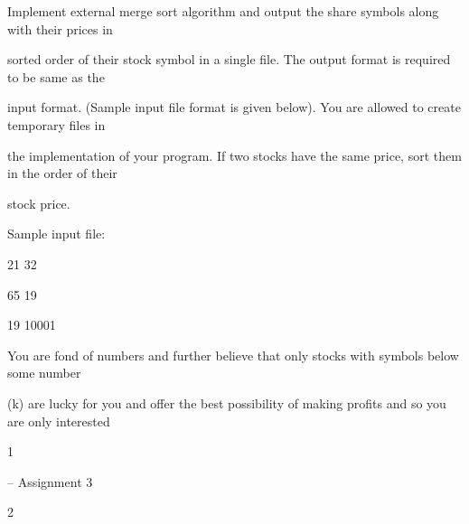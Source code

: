 \documentclass[a4paper,portrait,12pt]{article}
\begin{document}
\begin{flushleft}
Implement external merge sort algorithm and output the share symbols along with their prices in
\end{flushleft}


\begin{flushleft}
sorted order of their stock symbol in a single file. The output format is required to be same as the
\end{flushleft}


\begin{flushleft}
input format. (Sample input file format is given below). You are allowed to create temporary files in
\end{flushleft}


\begin{flushleft}
the implementation of your program. If two stocks have the same price, sort them in the order of their
\end{flushleft}


\begin{flushleft}
stock price.
\end{flushleft}


\begin{flushleft}
Sample input file:
\end{flushleft}


21 32


65 19


19 10001





\begin{flushleft}
You are fond of numbers and further believe that only stocks with symbols below some number
\end{flushleft}


\begin{flushleft}
(k) are lucky for you and offer the best possibility of making profits and so you are only interested
\end{flushleft}


1





\begin{flushleft}
\newpage
-- Assignment 3
\end{flushleft}





2
\end{document}
